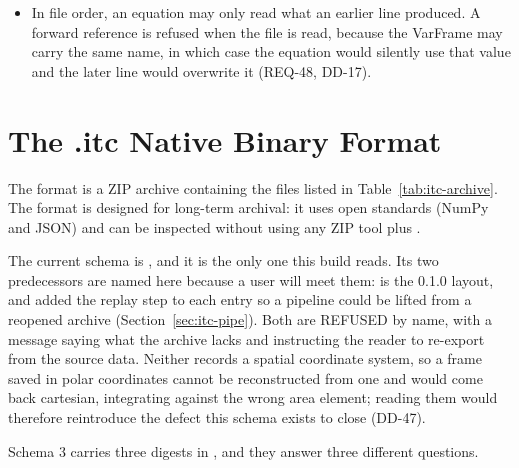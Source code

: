\begin{itemize}[noitemsep,topsep=2pt]
    MEASURED channel, where the frame carries a variable of that name,
    is refused by  rather than when the file is read,
    because only that step sees both the file and the frame. It is the
    more dangerous of the two: the equation runs on the declared number
    and the measurement is never read, so the result is wrong rather
    than merely unreachable (DD-39, OQ-31).
  \item In file order, an equation may only read what an earlier line
    produced. A forward reference is refused when the file is read,
    because the VarFrame may carry the same name, in which case the
    equation would silently use that value and the later line would
    overwrite it (REQ-48, DD-17).
\end{itemize}

\section{The .itc Native Binary Format}
\label{sec:itc-archive}

The  format is a ZIP archive containing the files listed in
Table~\ref{tab:itc-archive}. The format is designed for long-term archival:
it uses open standards (NumPy  and JSON) and can be inspected
without \itc{} using any ZIP tool plus .

The current schema is , and it is the only one this
build reads. Its two predecessors are named here because a user will
meet them:  is the 0.1.0 layout, and
 added the replay step to each 
entry so a pipeline could be lifted from a reopened archive
(Section~\ref{sec:itc-pipe}). Both are REFUSED by name, with a message
saying what the archive lacks and instructing the reader to re-export
from the source data. Neither records a spatial coordinate system, so a
frame saved in polar coordinates cannot be reconstructed from one and
would come back cartesian, integrating against the wrong area element;
reading them would therefore reintroduce the defect this schema exists
to close (DD-47).

Schema 3 carries three digests in , and they answer
three different questions.

